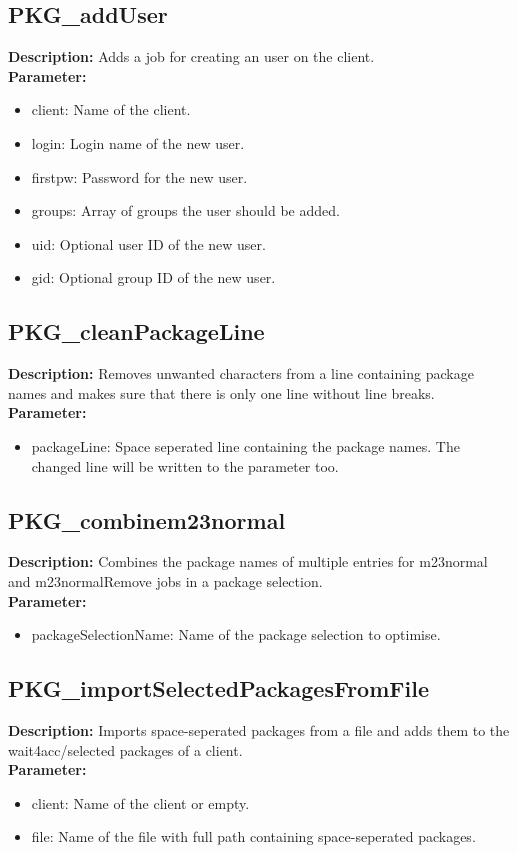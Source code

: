 \subsection{PKG\_addUser}
\textbf{Description:} Adds a job for creating an user on the client.\\
\textbf{Parameter:}
\begin{itemize}
\item client: Name of the client.
\item login: Login name of the new user.
\item firstpw: Password for the new user.
\item groups: Array of groups the user should be added.
\item uid: Optional user ID of the new user.
\item gid: Optional group ID of the new user.
\end{itemize}

\subsection{PKG\_cleanPackageLine}
\textbf{Description:} Removes unwanted characters from a line containing package names and makes sure that there is only one line without line breaks.\\
\textbf{Parameter:}
\begin{itemize}
\item packageLine: Space seperated line containing the package names. The changed line will be written to the parameter too.
\end{itemize}

\subsection{PKG\_combinem23normal}
\textbf{Description:} Combines the package names of multiple entries for m23normal and m23normalRemove jobs in a package selection.\\
\textbf{Parameter:}
\begin{itemize}
\item packageSelectionName: Name of the package selection to optimise.
\end{itemize}

\subsection{PKG\_importSelectedPackagesFromFile}
\textbf{Description:} Imports space-seperated packages from a file and adds them to the wait4acc/selected packages of a client.\\
\textbf{Parameter:}
\begin{itemize}
\item client: Name of the client or empty.
\item file: Name of the file with full path containing space-seperated packages.
\end{itemize}

